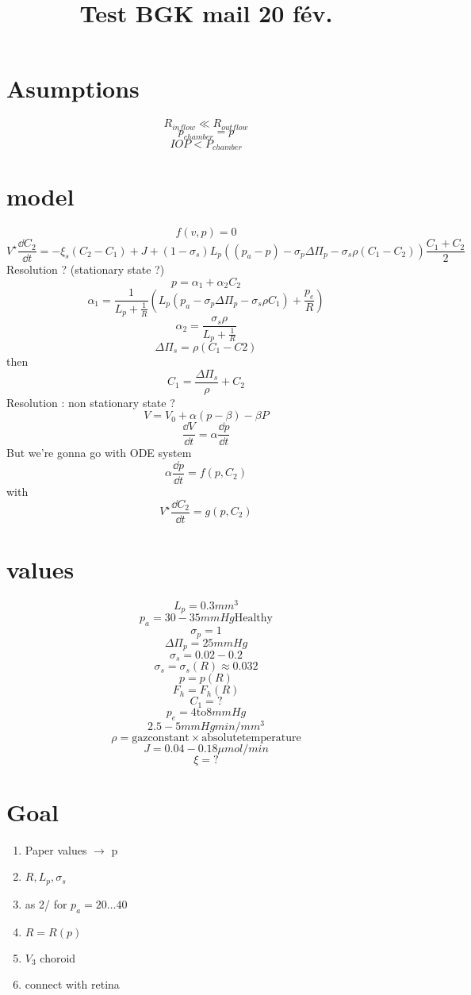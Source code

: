 \documentclass[11pt]{article}
\author{}
\title{Test BGK mail 20 fév.}
\date{}
\begin{document}
\section{Asumptions}
\[
R_{inflow} \ll R_{outflow}
\]
\[
p_{chamber} = p
\]
\[
IOP < P_{chamber}
\]

\section{model}
\[
f(v,p) = 0
\]
\[
V^\star \frac{\dd C_2}{\dd t} = - \xi_s (C_2-C_1) + J + \left(1- \sigma_s\right)L_p\left((p_a-p) - \sigma_p \Delta \Pi_p - \sigma_s \rho (C_1-C_2) \right) \frac{C_1 + C_2}{2}
\]
Resolution ? (stationary state ?)
\[
p = \alpha_1 + \alpha_2 C_2
\]
\[
\alpha_1 = \frac{1}{L_p + \frac{1}{R}} \left( L_p \left( p_a - \sigma_p \Delta \Pi_p - \sigma_s \rho C_1 \right) + \frac{p_e}{R}\right)
\]
\[
\alpha_2 = \frac{\sigma_s \rho}{L_p + \frac{1}{R}}
\]
\[
\Delta \Pi_s = \rho (C_1 - C2)
\]
then 
\[
C_1 = \frac{\Delta \Pi_s}{\rho} + C_2
\]
Resolution : non stationary state ? 
\[
V = V_0 + \alpha (p - \beta ) - \beta P
\]
\[
\frac{\dd V}{\dd t}= \alpha \frac{\dd p}{\dd t}
\]
But we're gonna go with ODE system
\[
\alpha \frac{\dd p}{\dd t} = f(p, C_2)
\]
with
\[
V^\star \frac{\dd C_2}{\dd t} = g(p, C_2)
\]
\section{values}
\[	
L_p = 0.3 mm^ 3
\]
\[
p_a = 30-35 mmHg \mathrm{Healthy}
\]
\[
\sigma_p = 1
\]
\[
\Delta \Pi_p = 25 mmHg
\]
\[
\sigma_s = 0.02-0.2
\]
\[
\sigma_s = \sigma_s (R) \approx 0.032
\]
\[
p = p(R)
\]
\[
F_h = F_h(R)
\]
\[
C_1 = ?
\]
\[
p_e = 4 \mathrm{to} 8 mmHg
\]
\[
2.5 - 5 mmHg min / mm^3
\]
\[
\rho = \mathrm{gaz constant } \times \mathrm{absolute temperature}
\]
\[
J = 0.04 - 0.18  \mu mol/min
\]
\[
\xi = ?
\]

\section{Goal}
\begin{enumerate}
\item Paper values $\rightarrow$ p
\item $R,L_p,\sigma_s$
\item as 2/ for $p_a = 20 \ldots 40$ 
\item $R = R(p)$
\item $V_3$ choroid
\item connect with retina
\end{enumerate}
\end{document}
